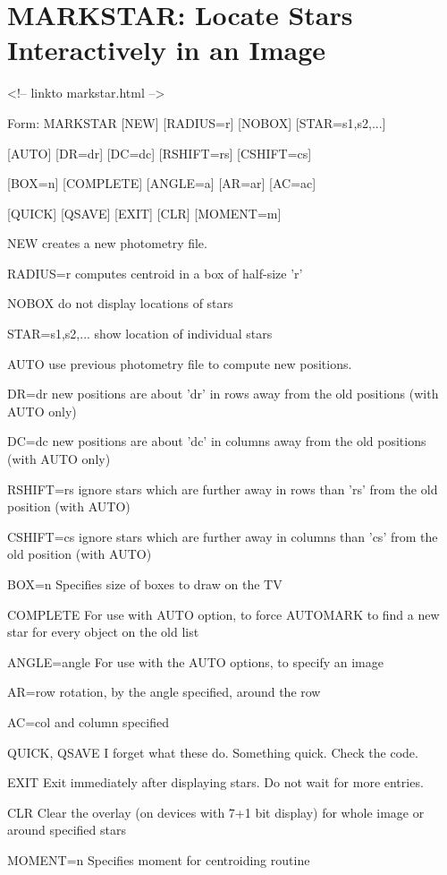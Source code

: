 \section{MARKSTAR: Locate Stars Interactively in an Image}
\begin{rawhtml}
<!-- linkto markstar.html -->
\end{rawhtml}
\begin{command}
  \item[Form: MARKSTAR {[NEW]} {[RADIUS=r]} {[NOBOX]} {[STAR=s1,s2,...]}\hfill]{}
  \item{{[AUTO]} {[DR=dr]} {[DC=dc]} {[RSHIFT=rs]} {[CSHIFT=cs]} }
  \item{{[BOX=n]} {[COMPLETE]} {[ANGLE=a]} {[AR=ar]} {[AC=ac]}}
  \item{{[QUICK]} {[QSAVE]} {[EXIT]} {[CLR]} {[MOMENT=m]}}
  \item[NEW]{creates a new photometry file.}
  \item[RADIUS=r]{computes centroid in a box of half-size 'r'}
  \item[NOBOX]{do not display locations of stars}
  \item[STAR=s1,s2,...]{show location of individual stars}
  \item[AUTO]{use previous photometry file to compute new
positions.}
  \item[DR=dr]{new positions are about 'dr' in rows away
from the old positions (with AUTO only)}
  \item[DC=dc]{new positions are about 'dc' in columns away
from the old positions (with AUTO only)}
  \item[RSHIFT=rs]{ignore stars which are further away in rows
than 'rs' from the old position (with AUTO)}
  \item[CSHIFT=cs]{ignore stars which are further away in columns
than 'cs' from the old position (with AUTO)}
  \item[BOX=n]{Specifies size of boxes to draw on the TV}
  \item[COMPLETE]{For use with AUTO option, to force AUTOMARK to
find a new star for every object on the old list}
  \item[ANGLE=angle]{     For use with the AUTO options, to specify an image}
  \item[AR=row]{rotation, by the angle specified, around the row}
  \item[AC=col]{and column specified}
  \item[QUICK, QSAVE]{I forget what these do. Something quick. Check the code.}
  \item[EXIT]{Exit immediately after displaying stars. Do not
wait for more entries.}
  \item[CLR]{Clear the overlay (on devices with 7+1 bit display)
for whole image or around specified stars}
  \item[MOMENT=n]{Specifies moment for centroiding routine}
\end{command}


